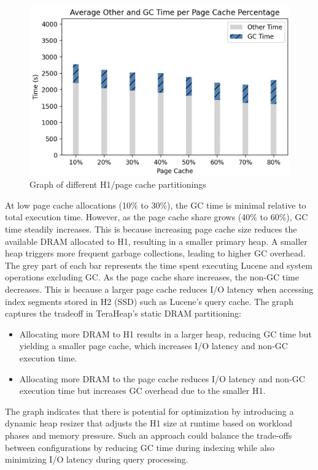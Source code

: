 \begin{figure}[htbp]
  \centering
  \includegraphics[width=1\columnwidth]{fig/numbers.png}
  \caption{Graph of different H1/page cache partitionings}
  \label{fig:graph}
\end{figure}

At low page cache allocations (10\% to 30\%), the GC time is minimal relative to total execution time. However, as the page cache share grows (40\% to 60\%), GC time steadily increases. This is because increasing page cache size reduces the available DRAM allocated to H1, resulting in a smaller primary heap. A smaller heap triggers more frequent garbage collections, leading to higher GC overhead.
The grey part of each bar represents the time spent executing Lucene and system operations excluding GC. As the page cache share increases, the non-GC time decreases. This is because a larger page cache reduces I/O latency when accessing index segments stored in H2 (SSD) such as Lucene's query cache.
The graph captures the tradeoff in TeraHeap’s static DRAM partitioning: \vspace{-0.5em} 
\begin{itemize} 
  \item Allocating more DRAM to H1 results in a larger heap, reducing GC time but yielding a smaller page cache, which increases I/O latency and non-GC execution time.
  \item Allocating more DRAM to the page cache reduces I/O latency and non-GC execution time but increases GC overhead due to the smaller H1.
\end{itemize} 
\vspace{-0.5em}
The graph indicates that there is potential for optimization by introducing a dynamic heap resizer that adjusts the H1 size at runtime based on workload phases and memory pressure. Such an approach could balance the trade-offs between configurations by reducing GC time during indexing while also minimizing I/O latency during query processing. 

